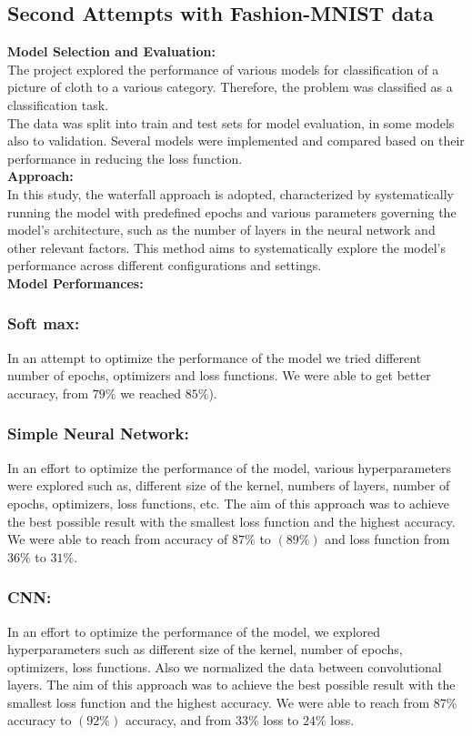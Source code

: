 \documentclass{article}
\begin{document}
\subsection{Second Attempts with Fashion-MNIST data}
\textbf{Model Selection and Evaluation:}\\
The project explored the performance of various models for classification of a picture of cloth to a various category. Therefore, the problem was classified as a classification task.\\
The data was split into train and test sets for model evaluation, in some models also to validation. Several models were implemented and compared based on their performance in reducing the loss function.\\\newline
\textbf{Approach:}\\
In this study, the waterfall approach is adopted, characterized by systematically running the model with predefined epochs and various parameters governing the model's architecture, such as the number of layers in the neural network and other relevant factors. This method aims to systematically explore the model's performance across different configurations and settings.\\\newline
\textbf{Model Performances:}
\subsubsection{Soft max:}
In an attempt to optimize the performance of the model we tried different number of epochs, optimizers and loss functions. We were able to get better accuracy, from ${79\%}$ we reached ${85\%}$).\\

\subsubsection{Simple Neural Network:}
In an effort to optimize the performance of the model, various hyperparameters were explored such as, different size of the kernel, numbers of layers, number of epochs, optimizers, loss functions, etc.
The aim of this approach was to achieve the best possible result with the smallest loss function and the highest accuracy. We were able to reach from accuracy of ${87\%}$ to $(89\%)$ and loss function from ${36\%}$ to ${31\%}$.\\

\subsubsection{CNN:}
In an effort to optimize the performance of the model, we explored hyperparameters such as different size of the kernel, number of epochs, optimizers, loss functions. Also  we normalized the data between convolutional layers.
The aim of this approach was to achieve the best possible result with the smallest loss function and the highest accuracy. We were able to reach from ${87\%}$ accuracy to $(92\%)$ accuracy, and from ${33\%}$ loss to ${24\%}$ loss.\\
\end{document}
